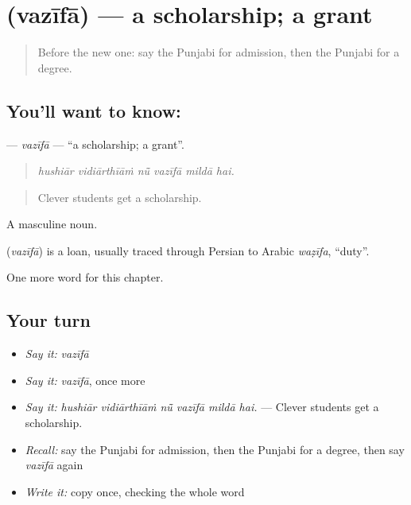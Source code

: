 \section[\texorpdfstring{\pa{ਵਜ਼ੀਫ਼ਾ} (vazīfā)}{ਵਜ਼ੀਫ਼ਾ (vazīfā)}]{ (vazīfā) — a scholarship; a grant}

\label{lesson:PA-C361-vazifa}



\begin{quote}
Before the new one: say the Punjabi for admission, then the Punjabi for a degree.
\end{quote}

\subsection*{You'll want to know: }
\textbf{} — \emph{vazīfā} — \textquotedblleft{}a scholarship; a grant\textquotedblright{}.

\begin{quote}
     
\end{quote}

\begin{quote}
\emph{hushiār vidiārthīāṁ nū̃ vazīfā mildā hai.}
\end{quote}

\begin{quote}
Clever students get a scholarship.
\end{quote}

A masculine noun.

\begin{cousinweb}
\textbf{} (\emph{vazīfā}) is a loan, usually traced through Persian to Arabic \emph{waẓīfa}, \textquotedblleft{}duty\textquotedblright{}.
\end{cousinweb}

\begin{grammarlens}[title={What you've built}]
One more word for this chapter.
\end{grammarlens}

\subsection*{Your turn}
\begin{itemize}
\raggedright
  \item \emph{Say it:} \emph{vazīfā}
  \item \emph{Say it:} \emph{vazīfā}, once more
  \item \emph{Say it:} \emph{hushiār vidiārthīāṁ nū̃ vazīfā mildā hai.} — Clever students get a scholarship.
  \item \emph{Recall:} say the Punjabi for admission, then the Punjabi for a degree, then say \emph{vazīfā} again
  \item \emph{Write it:} copy \textbf{} once, checking the whole word
\end{itemize}

